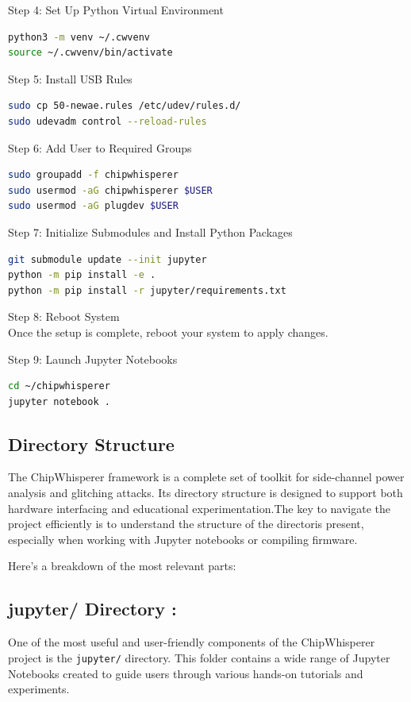 Step 4: Set Up Python Virtual Environment\\
\begin{lstlisting}[language=bash]
python3 -m venv ~/.cwvenv
source ~/.cwvenv/bin/activate
\end{lstlisting}

Step 5: Install USB Rules\\
\begin{lstlisting}[language=bash]
sudo cp 50-newae.rules /etc/udev/rules.d/
sudo udevadm control --reload-rules
\end{lstlisting}

Step 6: Add User to Required Groups\\
\begin{lstlisting}[language=bash]
sudo groupadd -f chipwhisperer
sudo usermod -aG chipwhisperer $USER
sudo usermod -aG plugdev $USER
\end{lstlisting}

Step 7: Initialize Submodules and Install Python Packages\\
\begin{lstlisting}[language=bash]
git submodule update --init jupyter
python -m pip install -e .
python -m pip install -r jupyter/requirements.txt
\end{lstlisting}

Step 8: Reboot System\\
Once the setup is complete, reboot your system to apply changes.

Step 9: Launch Jupyter Notebooks\\
\begin{lstlisting}[language=bash]
cd ~/chipwhisperer
jupyter notebook .
\end{lstlisting}

\subsection{Directory Structure}
The ChipWhisperer framework is a complete set of toolkit for side-channel power analysis and glitching attacks. Its directory structure is designed to support both hardware interfacing and educational experimentation.The key to navigate the project efficiently is to understand the structure of the directoris present, especially when working with Jupyter notebooks or compiling firmware.

Here’s a breakdown of the most relevant parts:

\subsection*{jupyter/ Directory :}
One of the most useful and user-friendly components of the ChipWhisperer project is the \texttt{jupyter/} directory. This folder contains a wide range of Jupyter Notebooks created to guide users through various hands-on tutorials and experiments.

